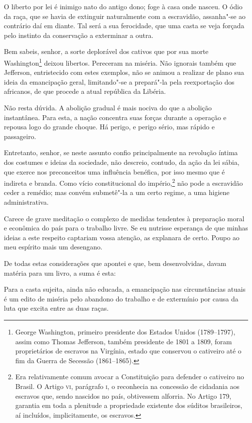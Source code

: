  O liberto por lei é inimigo nato do antigo dono; foge à casa onde
nasceu. O ódio da raça, que se havia de extinguir naturalmente com a
escravidão, assanha"-se ao contrário daí em diante. Tal será a sua
ferocidade, que uma casta se veja forçada pelo instinto da conservação
a exterminar a outra.

 Bem sabeis, senhor, a sorte deplorável dos cativos que por sua morte
Washington\footnote{ George Washington, primeiro presidente dos Estados Unidos
(1789--1797), assim como Thomas Jefferson, também presidente de 1801 a 1809, 
foram proprietários de escravos na Virgínia, estado que conservou o 
cativeiro até o fim da Guerra de Secessão (1861--1865).} deixou libertos. 
Pereceram na miséria. Não ignorais também que
Jefferson, entristecido com estes exemplos, não se animou a realizar de
plano sua ideia da emancipação geral, limitando"-se a prepará"-la
pela reexportação dos africanos, de que procede a atual república da Libéria.

 Não resta dúvida. A abolição gradual é mais nociva do que a abolição
instantânea. Para esta, a nação concentra suas forças durante a
operação e repousa logo do grande choque. Há perigo, e perigo sério, mas rápido e passageiro.

 Entretanto, senhor, se neste assunto confio principalmente na revolução
íntima dos costumes e ideias da sociedade, não descreio, contudo, da
ação da lei sábia, que exerce nos preconceitos uma influência benéfica,
por isso mesmo que é indireta e branda. Como vício constitucional do
império,\footnote{ Era relativamente comum avocar a Constituição para defender 
o cativeiro no Brasil. O Artigo \textsc{vi}, parágrafo \textsc{i}, o reconhecia na concessão de cidadania 
aos escravos que, sendo nascidos no país, obtivessem alforria. No Artigo 179, garantia 
em toda a plenitude a propriedade existente dos súditos brasileiros, aí incluídos, 
implicitamente, os escravos.} não pode a escravidão ceder a remédio; mas convém submetê"-la a um
certo regime, a uma higiene administrativa.

 Carece de grave meditação o complexo de medidas tendentes à preparação
moral e econômica do país para o trabalho livre. Se eu nutrisse
esperança de que minhas ideias a este respeito captariam vossa atenção,
as explanara de certo. Poupo ao meu espírito mais um desengano. 

 De todas estas considerações que apontei e que, bem desenvolvidas,
davam matéria para um livro, a suma é esta:

 Para a casta sujeita, ainda não educada, a emancipação nas
circunstâncias atuais é um edito de miséria pelo abandono do trabalho e
de extermínio por causa da luta que excita entre as duas raças.


